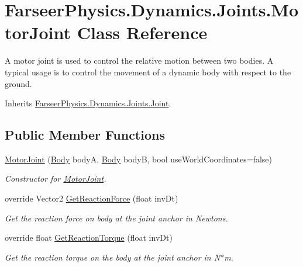 \hypertarget{class_farseer_physics_1_1_dynamics_1_1_joints_1_1_motor_joint}{\section{Farseer\+Physics.\+Dynamics.\+Joints.\+Motor\+Joint Class Reference}
\label{class_farseer_physics_1_1_dynamics_1_1_joints_1_1_motor_joint}
}


A motor joint is used to control the relative motion between two bodies. A typical usage is to control the movement of a dynamic body with respect to the ground.  




Inherits \hyperlink{class_farseer_physics_1_1_dynamics_1_1_joints_1_1_joint}{Farseer\+Physics.\+Dynamics.\+Joints.\+Joint}.

\subsection*{Public Member Functions}
\begin{DoxyCompactItemize}
\item 
\hyperlink{class_farseer_physics_1_1_dynamics_1_1_joints_1_1_motor_joint_a10a53e9f5982e4c5382aadabf9a05f0f}{Motor\+Joint} (\hyperlink{class_farseer_physics_1_1_dynamics_1_1_body}{Body} body\+A, \hyperlink{class_farseer_physics_1_1_dynamics_1_1_body}{Body} body\+B, bool use\+World\+Coordinates=false)
\begin{DoxyCompactList}\small\item\em Constructor for \hyperlink{class_farseer_physics_1_1_dynamics_1_1_joints_1_1_motor_joint}{Motor\+Joint}. \end{DoxyCompactList}\item 
override Vector2 \hyperlink{class_farseer_physics_1_1_dynamics_1_1_joints_1_1_motor_joint_ac3cd72010e24ea71d6eeee9cb43b3cbc}{Get\+Reaction\+Force} (float inv\+Dt)
\begin{DoxyCompactList}\small\item\em Get the reaction force on body at the joint anchor in Newtons. \end{DoxyCompactList}\item 
override float \hyperlink{class_farseer_physics_1_1_dynamics_1_1_joints_1_1_motor_joint_a858a34f8c7366b9f0583b1b6eb81f18b}{Get\+Reaction\+Torque} (float inv\+Dt)
\begin{DoxyCompactList}\small\item\em Get the reaction torque on the body at the joint anchor in N$\ast$m. \end{DoxyCompactList}\end{DoxyCompactItemize}
